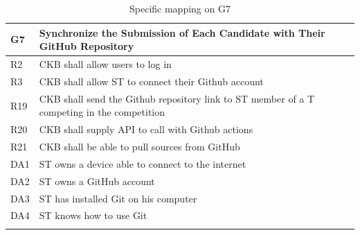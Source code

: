   \begin{longtable}{|l|p{12cm}|}
    \hline
    \textbf{G7} & \textbf{Synchronize the Submission of Each Candidate with Their GitHub Repository}      \\
    \hline
    R2 & CKB shall allow users to log in \\
    \hline
    R3 & CKB shall allow ST to connect their Github account \\
    \hline
    R19 & CKB shall send the Github repository link to ST member of a T competing in the competition \\
    \hline
    R20 & CKB shall supply API to call with Github actions \\
    \hline
    R21 & CKB shall be able to pull sources from GitHub \\
    \hline
    DA1 & ST owns a device able to connect to the internet \\
    \hline
    DA2 & ST owns a GitHub account \\
    \hline
    DA3 & ST has installed Git on his computer \\
    \hline
    DA4 & ST knows how to use Git \\
    \hline

    \caption{Specific mapping on G7}
    \label{tab:mappingG7}
  \end{longtable}


